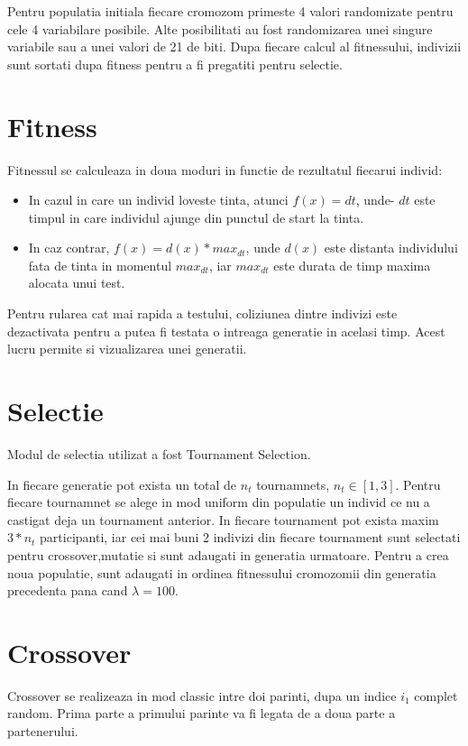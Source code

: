 Pentru populatia initiala fiecare cromozom primeste 4 valori randomizate pentru cele 4 variabilare posibile. Alte posibilitati au fost randomizarea unei singure variabile sau a unei valori de 21 de biti. Dupa fiecare calcul al fitnessului, indivizii sunt sortati dupa fitness pentru a fi pregatiti pentru selectie. 
\section{Fitness}

Fitnessul se calculeaza in doua moduri in functie de rezultatul fiecarui individ:
\begin{itemize}
    \item In cazul in care un individ loveste tinta, atunci $f(x) = dt$, unde- $dt$ este timpul in care individul ajunge din punctul de start la tinta.
    \item In caz contrar, $f(x) = d(x) * max_{dt}$, unde $d(x)$ este distanta individului fata de tinta in momentul $max_{dt}$, iar $max_{dt}$ este durata de timp maxima alocata unui test.
\end{itemize}  

Pentru rularea cat mai rapida a testului, coliziunea dintre indivizi este dezactivata pentru a putea fi testata o intreaga generatie in acelasi timp. Acest lucru permite si vizualizarea unei generatii.

\section{Selectie}
 
Modul de selectia utilizat a fost Tournament Selection.

In fiecare generatie pot exista un total de $n_{t}$ tournamnets, $n_{t} \in [1,3]$. Pentru fiecare tournamnet se alege in mod uniform din populatie un individ ce nu a castigat deja un tournament anterior. In fiecare tournament pot exista maxim $3*n_{t}$ participanti, iar cei mai buni 2 indivizi din fiecare tournament sunt selectati pentru crossover,mutatie si sunt adaugati in generatia urmatoare. Pentru a crea noua populatie, sunt adaugati in ordinea fitnessului cromozomii din generatia precedenta pana cand $\lambda = 100$.

\section{Crossover}
Crossover se realizeaza in mod classic intre doi parinti, dupa un indice $i_{1}$ complet random. Prima parte a primului parinte va fi legata de a doua parte a partenerului.

